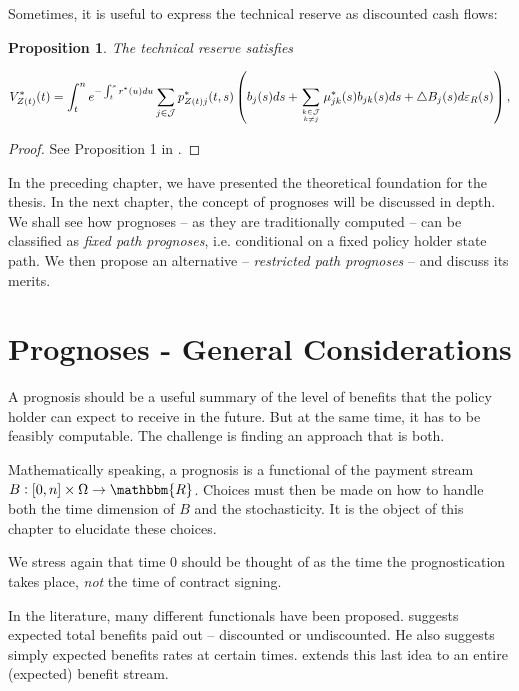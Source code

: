 \documentclass{article}
\newcommand{\1}[1]{\mathbbm{1}_{\left\lbrace #1 \right\rbrace}}
\theoremstyle{break}
\newtheorem{proposition}[definition]{Proposition}%
\theoremstyle{remark}
\numberwithin{equation}{section}
\begin{document}
Sometimes, it is useful to express the technical reserve as discounted cash flows: 

\begin{proposition}
	The technical reserve satisfies
	
	\begin{align*}
		V_{Z(t)}^*(t) = \int_t^n e^{-\int_t^s r^*(u)du} \sum_{j \in \mathcal{J}} p_{Z(t)j}^*(t,s) \left( b_j(s)ds + \sum_{k \in \mathcal{J} \atop k \neq j} \mu_{jk}^*(s)b_{jk}(s)ds + \triangle B_j(s) d \varepsilon_{R}(s) \right),
	\end{align*}
\end{proposition}

\begin{proof}
	See Proposition 1 in \cite{BuchardtMoller}.
\end{proof}

\bigbreak
\bigbreak
\bigbreak

In the preceding chapter, we have presented the theoretical foundation for the thesis. In the next chapter, the concept of prognoses will be discussed in depth. We shall see how prognoses -- as they are traditionally computed -- can be classified as \textit{fixed path prognoses}, i.e. conditional on a fixed policy holder state path. We then propose an alternative -- \textit{restricted path prognoses} -- and discuss its merits.

\newpage
\section{Prognoses - General Considerations}

A prognosis should be a useful summary of the level of benefits that the policy holder can expect to receive in the future. But at the same time, it has to be  feasibly computable. The challenge is finding an approach that is both.

Mathematically speaking, a prognosis is a functional of the payment stream $B: [0,n] \times \Omega \to \mathbbm{R}$. Choices must then be made on how to handle both the time dimension of $B$ and the stochasticity. It is the object of this chapter to elucidate these choices.

We stress again that time 0 should be thought of as the time the prognostication takes place, \textit{not} the time of contract signing.

In the literature, many different functionals have been proposed. \cite{Norberg2001} suggests expected total benefits paid out -- discounted or undiscounted. He also suggests simply expected benefits rates at certain times. \cite{NinnaReitzel} extends this last idea to an entire (expected) benefit stream.
\end{document}
